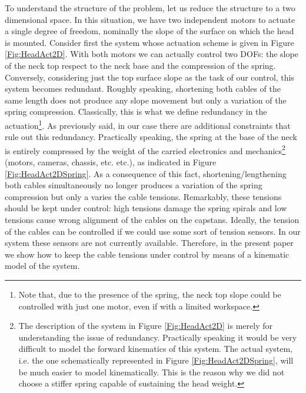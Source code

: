 \documentclass[conference]{IEEEtran}
\numberwithin{equation}{section}
\begin{document}
To understand the structure of the problem, let us reduce the structure to a two dimensional space. In this situation, we have two independent motors to actuate a single degree of freedom, nominally the slope of the surface on which the head is mounted.
Consider first the system whose actuation scheme is given in Figure \ref{Fig:HeadAct2D}. With both motors we can actually control two DOFs: the slope of the neck top respect to the neck base and the compression of the spring. Conversely, considering just the top surface slope as the task of our control, this system becomes redundant. Roughly speaking, shortening both cables of the same length does not produce any slope movement but only a variation of the spring compression. Classically, this is what we define redundancy in the actuation\footnote{Note that, due to the presence of the spring, the neck top slope could be controlled with just one motor, even if with a limited workspace.}.
As previously said, in our case there are additional constraints that rule out this redundancy. Practically speaking, the spring at the base of the neck is entirely compressed by the weight of the carried electronics and mechanics\footnote{The description of the system in Figure \ref{Fig:HeadAct2D} is merely for understanding the issue of redundancy. Practically speaking it would be very difficult to model the forward kinematics of this system. The actual system, i.e. the one schematically represented in Figure \ref{Fig:HeadAct2DSpring}, will be much easier to model kinematically. This is the reason why we did not choose a stiffer spring capable of sustaining the head weight.} (motors, cameras, chassis, etc. etc.), as indicated in Figure \ref{Fig:HeadAct2DSpring}. As a consequence of this fact, shortening/lengthening both cables simultaneously no longer produces a variation of the spring compression but only a varies the cable tensions. Remarkably, these tensions should be kept under control: high tensions damage the spring spirals and low tensions cause wrong alignment of the cables on the capstans. Ideally, the tension of the cables can be controlled if we could use some sort of tension sensors. In our system these sensors are not currently available. Therefore, in the present paper we show how to keep the cable tensions under control by means of a kinematic model of the system.
\end{document}
